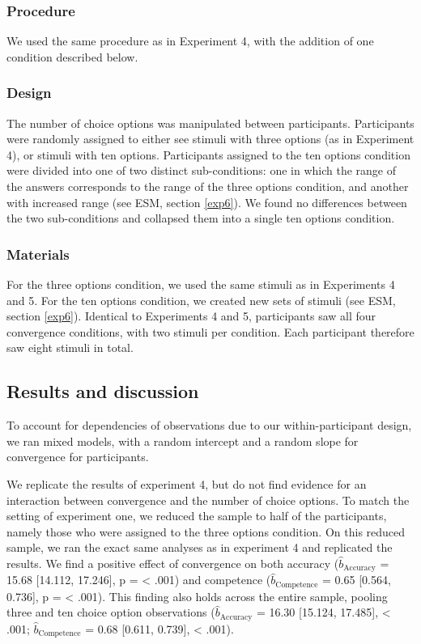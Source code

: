 \documentclass[
  doc,floatsintext]{apa6}
\begin{document}
\subsubsection{Procedure}\label{procedure-4}

We used the same procedure as in Experiment 4, with the addition of one condition described below.

\subsubsection{Design}\label{design-5}

The number of choice options was manipulated between participants. Participants were randomly assigned to either see stimuli with three options (as in Experiment 4), or stimuli with ten options. Participants assigned to the ten options condition were divided into one of two distinct sub-conditions: one in which the range of the answers corresponds to the range of the three options condition, and another with increased range (see ESM, section \ref{exp6}). We found no differences between the two sub-conditions and collapsed them into a single ten options condition.

\subsubsection{Materials}\label{materials-5}

For the three options condition, we used the same stimuli as in Experiments 4 and 5. For the ten options condition, we created new sets of stimuli (see ESM, section \ref{exp6}). Identical to Experiments 4 and 5, participants saw all four convergence conditions, with two stimuli per condition. Each participant therefore saw eight stimuli in total.

\subsection{Results and discussion}\label{results-and-discussion-5}

To account for dependencies of observations due to our within-participant design, we ran mixed models, with a random intercept and a random slope for convergence for participants.

We replicate the results of experiment 4, but do not find evidence for an interaction between convergence and the number of choice options. To match the setting of experiment one, we reduced the sample to half of the participants, namely those who were assigned to the three options condition. On this reduced sample, we ran the exact same analyses as in experiment 4 and replicated the results. We find a positive effect of convergence on both accuracy (\(\hat{b}_{\text{Accuracy}}\) = 15.68 {[}14.112, 17.246{]}, p = \textless{} .001) and competence (\(\hat{b}_{\text{Competence}}\) = 0.65 {[}0.564, 0.736{]}, p = \textless{} .001). This finding also holds across the entire sample, pooling three and ten choice option observations (\(\hat{b}_{\text{Accuracy}}\) = 16.30 {[}15.124, 17.485{]}, \textless{} .001; \(\hat{b}_{\text{Competence}}\) = 0.68 {[}0.611, 0.739{]}, \textless{} .001).
\end{document}
